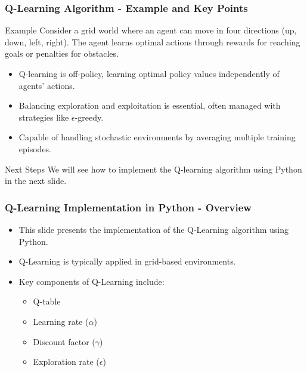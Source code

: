 \documentclass{beamer}
\begin{document}
\begin{frame}[fragile]
    \frametitle{Q-Learning Algorithm - Example and Key Points}
    \begin{block}{Example}
        Consider a grid world where an agent can move in four directions (up, down, left, right). The agent learns optimal actions through rewards for reaching goals or penalties for obstacles.
    \end{block}
    
    \begin{itemize}
        \item Q-learning is off-policy, learning optimal policy values independently of agents' actions.
        \item Balancing exploration and exploitation is essential, often managed with strategies like \( \epsilon \)-greedy.
        \item Capable of handling stochastic environments by averaging multiple training episodes.
    \end{itemize}
    
    \begin{block}{Next Steps}
        We will see how to implement the Q-learning algorithm using Python in the next slide.
    \end{block}
\end{frame}

\begin{frame}[fragile]
    \frametitle{Q-Learning Implementation in Python - Overview}
    \begin{itemize}
        \item This slide presents the implementation of the Q-Learning algorithm using Python.
        \item Q-Learning is typically applied in grid-based environments.
        \item Key components of Q-Learning include:
        \begin{itemize}
            \item Q-table
            \item Learning rate ($\alpha$)
            \item Discount factor ($\gamma$)
            \item Exploration rate ($\epsilon$)
        \end{itemize}
    \end{itemize}
\end{frame}
\end{document}
